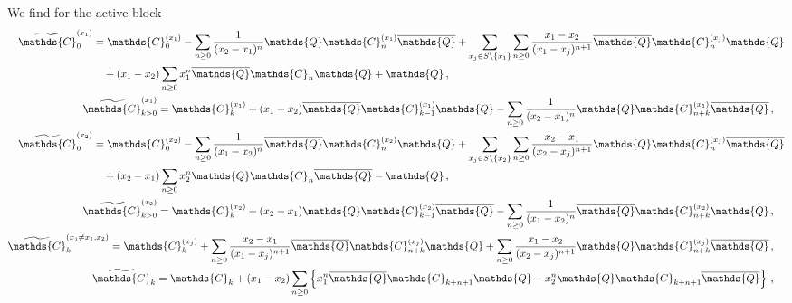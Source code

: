 \documentclass[12pt]{article}
\numberwithin{equation}{section}
\numberwithin{figure}{section}
\newcommand{\C}{\mathds{C}}
\newcommand{\Q}{\mathds{Q}}
\newcommand{\Qbar}{\overline\Q}
\begin{document}
      We find for the active block
      \begin{subequations}
        \begin{align}
          \begin{split} \label{eq:bal_x1_x2_Cx10}
            \widetilde \C^{(x_1)}_0 &=
            \C^{(x_1)}_0
            -
            \sum\limits_{n\geq0} \frac1{(x_2-x_1)^n} 
            \Q \C^{(x_1)}_n \Qbar 
            +
            \sum\limits_{x_j\in S\backslash\{x_1\}} 
            \sum\limits_{n\geq0} 
            \frac{x_1-x_2}{(x_1-x_j)^{n+1}} 
            \Qbar \C^{(x_j)}_n \Q \\ &\quad
            +  (x_1-x_2) \sum\limits_{n\geq0} x_1^n \Qbar \C_n \Q 
            + \Q\,, 
          \end{split} \\   
          \begin{split}
            \widetilde \C^{(x_1)}_{k>0} &=
            \C^{(x_1)}_k
            +
            (x_1-x_2) \Qbar \C^{(x_1)}_{k-1} \Q
            -
            \sum\limits_{n\geq0} \frac1{(x_2-x_1)^n} 
            \Q \C^{(x_1)}_{n+k} \Qbar\,,
          \end{split} \label{eq:bal_x1_x2_Cx1k} \\
          \begin{split}
            \widetilde \C^{(x_2)}_0 &=
            \C^{(x_2)}_0
            - 
            \sum\limits_{n\geq0} 
            \frac1{(x_1-x_2)^n} 
            \Qbar \C^{(x_2)}_n \Q
            +
            \sum\limits_{x_j\in S\backslash\{x_2\}}
            \sum\limits_{n\geq0} \frac{x_2-x_1}{(x_2-x_j)^{n+1}} 
            \Q \C^{(x_j)}_n \Qbar \\ &\quad
            + (x_2-x_1) \sum\limits_{n\geq0} x_2^n \Q \C_n \Qbar
            - \Q\,, 
          \end{split} \\
          \begin{split} 
            \widetilde \C^{(x_2)}_{k>0} &=
            \C^{(x_2)}_k
            +
            (x_2-x_1)
            \Q \C^{(x_2)}_{k-1} \Qbar
            - 
            \sum\limits_{n\geq0} 
            \frac1{(x_1-x_2)^n} 
            \Qbar \C^{(x_2)}_{n+k} \Q\,,
          \end{split} \label{eq:bal_x1_x2_Cx2k} \\
          \begin{split}
            \widetilde \C^{(x_j\neq x_1,x_2)}_k &=
            \C^{(x_j)}_k
            +
            \sum\limits_{n\geq0} 
            \frac{x_2-x_1}{(x_1-x_j)^{n+1}} 
            \Qbar \C^{(x_j)}_{n+k} \Q 
            + 
            \sum\limits_{n\geq0} 
            \frac{x_1-x_2}{(x_2-x_j)^{n+1}} 
            \Q \C^{(x_j)}_{n+k} \Qbar\,, 
          \end{split} \\
          \begin{split}
            \widetilde \C_k &= 
            \C_k +
            (x_1 - x_2)
            \sum\limits_{n\geq0} \left\{
              x_1^n \Qbar \C_{k+n+1} \Q
              - x_2^n \Q \C_{k+n+1} \Qbar
            \right\}\,,
          \end{split}            
        \end{align}
      \end{subequations}        
\end{document}
